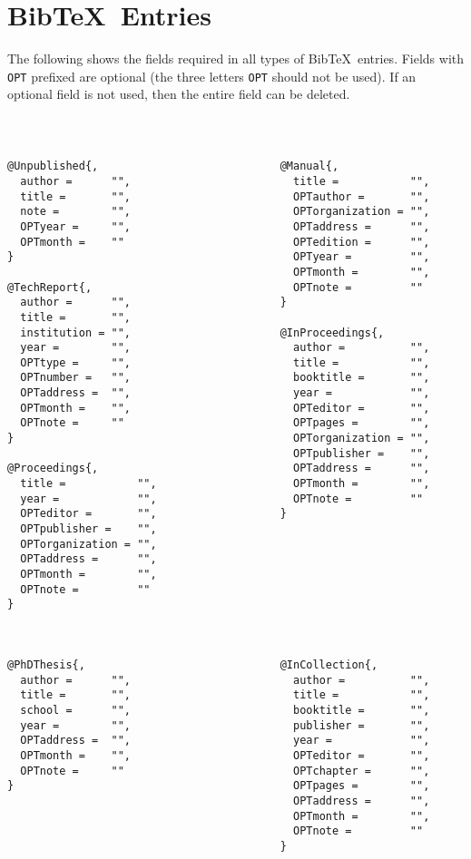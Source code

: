 \chapter{Bib\TeX\ Entries}
\label{bibrefs}
The following shows the fields required in all types of Bib\TeX\ entries.
Fields with {\tt OPT} prefixed are optional (the three letters {\tt OPT} should 
not be used).  If an optional field is not used, then the entire field can be deleted.

{\tt
\singlespace
\begin{verbatim}

@Unpublished{,                            @Manual{,
  author =      "",                         title =           "",
  title =       "",                         OPTauthor =       "",
  note =        "",                         OPTorganization = "",
  OPTyear =     "",                         OPTaddress =      "",
  OPTmonth =    ""                          OPTedition =      "",
}                                           OPTyear =         "",
                                            OPTmonth =        "",
@TechReport{,                               OPTnote =         "" 
  author =      "",                       }
  title =       "",
  institution = "",                       @InProceedings{,
  year =        "",                         author =          "",
  OPTtype =     "",                         title =           "",
  OPTnumber =   "",                         booktitle =       "",
  OPTaddress =  "",                         year =            "",
  OPTmonth =    "",                         OPTeditor =       "",
  OPTnote =     ""                          OPTpages =        "",
}                                           OPTorganization = "",
                                            OPTpublisher =    "",
@Proceedings{,                              OPTaddress =      "",
  title =           "",                     OPTmonth =        "",
  year =            "",                     OPTnote =         "" 
  OPTeditor =       "",                   }
  OPTpublisher =    "",
  OPTorganization = "",
  OPTaddress =      "",
  OPTmonth =        "",
  OPTnote =         "" 
}



@PhDThesis{,                              @InCollection{,
  author =      "",                         author =          "",
  title =       "",                         title =           "",
  school =      "",                         booktitle =       "",
  year =        "",                         publisher =       "",
  OPTaddress =  "",                         year =            "",
  OPTmonth =    "",                         OPTeditor =       "",
  OPTnote =     ""                          OPTchapter =      "",
}                                           OPTpages =        "",
                                            OPTaddress =      "",
                                            OPTmonth =        "",
                                            OPTnote =         ""
                                          }


\end{verbatim}}
